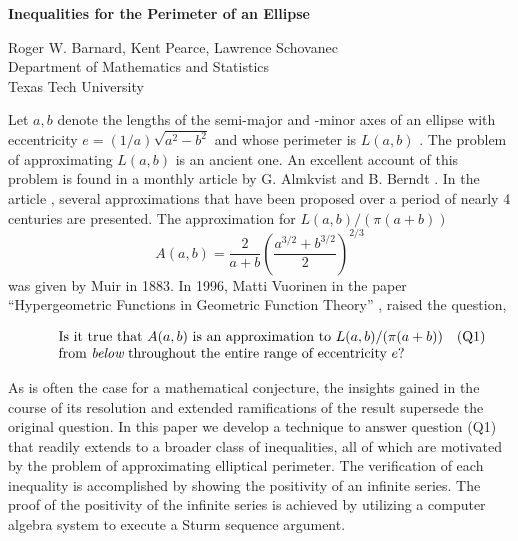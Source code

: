 \documentclass[12pt]{article}
\begin{document}
\begin{center} {\bf  \Large{ Inequalities for the Perimeter of an Ellipse}} 
\end{center}

\vspace{24pt}



\begin{center}{Roger W. Barnard, Kent Pearce, Lawrence Schovanec\\ 
Department of Mathematics and Statistics\\ Texas Tech University }
\end{center}



\vspace{18pt} 
\vspace{6pt}

Let $a,b$ denote the lengths of the  semi-major and -minor axes of an ellipse 
with
eccentricity $e=(1/a)\sqrt{a^2 - b^2}$  and whose perimeter is $L(a,b)$ . 
The
problem of approximating  $L(a,b)$ is an ancient one.  An excellent 
account of this
problem is found in a  {\sc monthly} article   by
G. Almkvist and B.  Berndt \cite{AB}. In the article \cite{AB},
several  approximations that have been proposed over a period of nearly 4 
centuries
are presented. The  approximation for $L(a,b)/(\pi (a+b))$
$$
A(a,b)=\frac{2}{a+b}\left(\frac{a^{3/2}+b^{3/2}}{2}\right)^{2/3}
$$ 
was given by Muir
in 1883.    In 1996,   Matti Vuorinen in the paper ``Hypergeometric 
Functions in
Geometric Function Theory'' \cite{MV}, raised the question, 

$$
\begin{array}{llr}
\hspace{0.1in}& \mbox{Is it true that } A(a,b) \mbox{ is an approximation to }
L(a,b)/(\pi (a+b)) & \mbox{(Q1)} \\
&\mbox{from {\em below} throughout the entire range of eccentricity } e \mbox{?}   
\end{array}
$$

As is often the case for a mathematical conjecture, the insights  gained 
in the course of its
resolution  and   extended ramifications of the result supersede the 
original question. In this paper
we develop a technique to answer  question  (Q1) that readily extends 
to a broader class of
inequalities, all of which are motivated by the problem of approximating 
elliptical perimeter.  The
verification of each inequality is accomplished  by showing the 
positivity of an infinite  series.  
The proof of the positivity of the  infinite series is achieved by 
utilizing a computer algebra system
to execute a Sturm sequence argument.  
 
\end{document}
